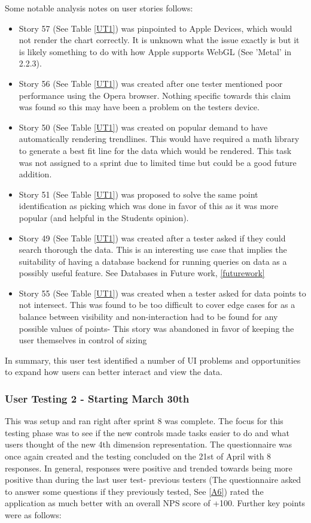 Some notable analysis notes on user stories follows:

\begin{itemize}
    \item Story 57 (See Table \ref{UT1}) was pinpointed to Apple Devices, which would not render the chart correctly. It is unknown what the issue exactly is but it is likely something to do with how Apple supports WebGL \cite{khronosgroup_2022_webgl} (See 'Metal' in 2.2.3).
    \item Story 56 (See Table \ref{UT1}) was created after one tester mentioned poor performance using the Opera browser. Nothing specific towards this claim was found so this may have been a problem on the testers device.
    \item Story 50 (See Table \ref{UT1}) was created on popular demand to have automatically rendering trendlines. This would have required a math library to generate a best fit line for the data which would be rendered. This task was not assigned to a sprint due to limited time but could be a good future addition.
    \item Story 51 (See Table \ref{UT1}) was proposed to solve the same point identification as picking which was done in favor of this as it was more popular (and helpful in the Students opinion).
    \item Story 49 (See Table \ref{UT1}) was created after a tester asked if they could search thorough the data. This is an interesting use case that implies the suitability of having a database backend for running queries on data as a possibly useful feature. See Databases in Future work, \ref{futurework}
    \item Story 55 (See Table \ref{UT1}) was created when a tester asked for data points to not intersect. This was found to be too difficult to cover edge cases for as a balance between visibility and non-interaction had to be found for any possible values of points- This story was abandoned in favor of keeping the user themselves in control of sizing
\end{itemize}

In summary, this user test identified a number of UI problems and opportunities to expand how users can better interact and view the data.

\subsubsection{User Testing 2 - Starting March 30th} \label{usertestanalysis2}
This was setup and ran right after sprint 8 was complete. The focus for this testing phase was to see if the new controls made tasks easier to do and what users thought of the new 4th dimension representation. The questionnaire was once again created and the testing concluded on the 21st of April with 8 responses. In general, responses were positive and trended towards being more positive than during the last user test- previous testers (The questionnaire asked to answer some questions if they previously tested, See \ref{A6}) rated the application as much better with an overall NPS score of +100. Further key points were as follows:

